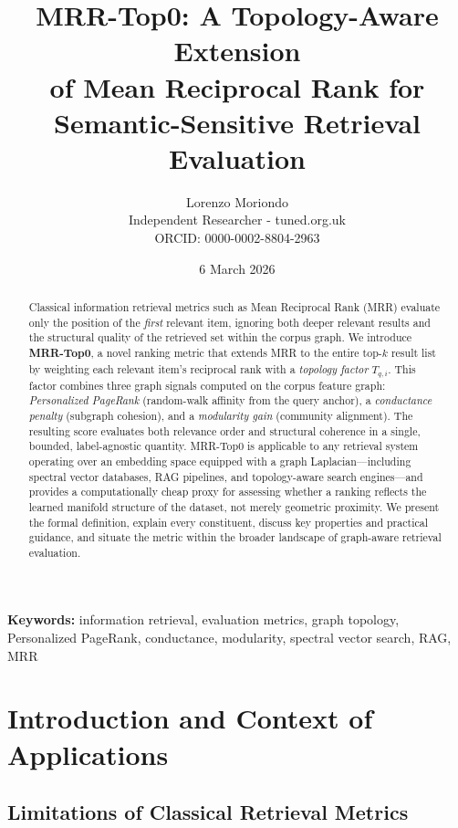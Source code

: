 \documentclass[11pt,a4paper]{article}
\title{%
	\textbf{MRR-Top0: A Topology-Aware Extension\\of Mean Reciprocal Rank
		for Semantic-Sensitive Retrieval Evaluation}
}
\author{Lorenzo Moriondo\\
	\small Independent Researcher - tuned.org.uk\\
	\small ORCID: 0000-0002-8804-2963}
\date{6 March 2026}
\begin{document}
\maketitle

\begin{abstract}
Classical information retrieval metrics such as Mean Reciprocal Rank (MRR)
evaluate only the position of the \emph{first} relevant item, ignoring both
deeper relevant results and the structural quality of the retrieved set within
the corpus graph.  We introduce \textbf{MRR-Top0}, a novel ranking metric that
extends MRR to the entire top-$k$ result list by weighting each relevant
item's reciprocal rank with a \emph{topology factor} $T_{q,i}$.  This factor
combines three graph signals computed on the corpus feature graph:
\emph{Personalized PageRank} (random-walk affinity from the query anchor),
a \emph{conductance penalty} (subgraph cohesion), and a \emph{modularity gain}
(community alignment).  The resulting score evaluates both relevance order
and structural coherence in a single, bounded, label-agnostic quantity.
MRR-Top0 is applicable to any retrieval system operating over an
embedding space equipped with a graph Laplacian---including spectral
vector databases, RAG pipelines, and topology-aware search engines---and
provides a computationally cheap proxy for assessing whether a ranking
reflects the learned manifold structure of the dataset, not merely
geometric proximity.  We present the formal definition, explain every
constituent, discuss key properties and practical guidance, and situate
the metric within the broader landscape of graph-aware retrieval
evaluation.
\end{abstract}

\vspace{1em}
\noindent\textbf{Keywords:}
information retrieval, evaluation metrics, graph topology, Personalized
PageRank, conductance, modularity, spectral vector search, RAG, MRR

\section{Introduction and Context of Applications}
\label{sec:intro}

\subsection{Limitations of Classical Retrieval Metrics}
\end{document}
